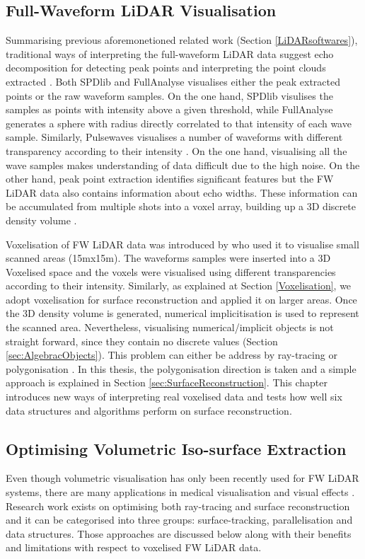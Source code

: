 \documentclass{subfiles}
\begin{document}
\subsection{Full-Waveform LiDAR Visualisation}

Summarising previous aforemonetioned related work (Section \ref{LiDARsoftwares}), traditional ways of interpreting the full-waveform LiDAR data suggest echo decomposition for detecting peak points and interpreting the point clouds extracted \cite{Wanger2006}. Both SPDlib \cite{Bunting2013} and FullAnalyse \cite{Chauve2009} visualises either the peak extracted points or the raw waveform samples. On the one hand, SPDlib visulises the samples as points with intensity above a given threshold, while FullAnalyse generates a sphere with radius directly correlated to that intensity of each wave sample. Similarly, Pulsewaves visualises a number of waveforms with different transparency according to their intensity \cite{Isenburg2012Pulsewaves}. On the one hand, visualising all the wave samples makes understanding of data difficult due to the high noise. On the other hand, peak point extraction identifies significant features but the FW LiDAR data also contains information about echo widths. These information can be accumulated from multiple shots into a voxel array, building up a 3D discrete density volume \cite{Miltiadou2014}. 
\par Voxelisation of FW LiDAR data was introduced by \cite{Persson2005} who used it to visualise small scanned areas (15mx15m). The waveforms samples were inserted into a 3D Voxelised space and the voxels were visualised using different transparencies according to their intensity. Similarly, as explained at Section \ref{Voxelisation}, we adopt voxelisation for surface reconstruction and applied it on larger areas. Once the 3D density volume is generated, numerical implicitisation is used to represent the scanned area. Nevertheless, visualising numerical/implicit objects is not straight forward, since they contain no discrete values (Section \ref{sec:AlgebracObjects}). This problem can either be address by ray-tracing \cite{Hanrahan1983} or polygonisation \cite{Lorensen1987}. In this thesis, the polygonisation direction is taken and a simple approach is explained in Section \ref{sec:SurfaceReconstruction}. This chapter introduces new ways of interpreting real voxelised data and tests how well six data structures and algorithms perform on surface reconstruction.


\subsection{Optimising Volumetric Iso-surface Extraction}
\par Even though volumetric visualisation has only been recently used for FW LiDAR systems, there are many applications in medical visualisation \cite{Levoy1998} \cite{Hadwiger2012} and visual effects \cite{Crassin2009} \cite{Laine2011SparseOctrees}. Research work exists on optimising both ray-tracing and surface reconstruction and it can be categorised into three groups: surface-tracking, parallelisation and data structures. Those approaches are discussed below along with their benefits and limitations with respect to voxelised FW LiDAR data.
\end{document}
